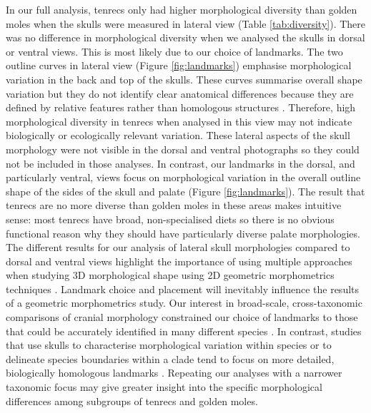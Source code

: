 \documentclass[12pt,a4paper]{article}
\begin{document}
	In our full analysis, tenrecs only had higher morphological diversity than golden moles when the skulls were measured in lateral view (Table \ref{tab:diversity}). There was no difference in morphological diversity when we analysed the skulls in dorsal or ventral views. This is most likely due to our choice of landmarks. The two outline curves in lateral view (Figure \ref{fig:landmarks}) emphasise morphological variation in the back and top of the skulls. These curves summarise overall shape variation but they do not identify clear anatomical differences because they are defined by relative features rather than homologous structures \citep{Zelditch2012}. Therefore, high morphological diversity in tenrecs when analysed in this view may not indicate biologically or ecologically relevant variation.	
	These lateral aspects of the skull morphology were not visible in the dorsal and ventral photographs so they could not be included in those analyses. In contrast, our landmarks in the dorsal, and particularly ventral, views focus on morphological variation in the overall outline shape of the sides of the skull and palate (Figure \ref{fig:landmarks}). The result that tenrecs are no more diverse than golden moles in these areas makes intuitive sense: most tenrecs have broad, non-specialised diets \citep{Olson2013} so there is no obvious functional reason why they should have particularly diverse palate morphologies. The different results for our analysis of lateral skull morphologies compared to dorsal and ventral views highlight the importance of using multiple approaches when studying 3D morphological shape using 2D geometric morphometrics techniques \citep{Arnqvist1998}.
	Landmark choice and placement will inevitably influence the results of a geometric morphometrics study. Our interest in broad-scale, cross-taxonomic comparisons of cranial morphology constrained our choice of landmarks to those that could be accurately identified in many different species \citep[e.g.][]{Ruta2013, Goswami2011, Wroe2007}. In contrast, studies that use skulls to characterise morphological variation within species \citep[e.g.][]{Blagojevic2011, Bornholdt2008} or to delineate species boundaries within a clade \citep[e.g.][]{Panchetti2008} tend to focus on more detailed, biologically homologous landmarks \citep{Zelditch2012}. Repeating our analyses with a narrower taxonomic focus may give greater insight into the specific morphological differences among subgroups of tenrecs and golden moles.
	
\end{document}
